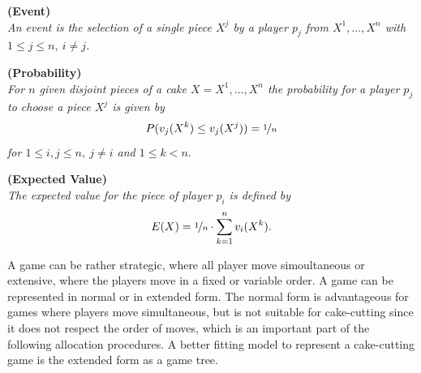\begin{defi}{\textbf{(Event)}}\\
\emph{An \emph{event} is the selection of a single piece $X^j$ by a player $p_j$ from $X^1, \ldots, X^n$ with $1 \leq j \leq n,\: i \neq j$.}
\end{defi}
\begin{defi}{\textbf{(Probability)}}\\
\emph{For $n$ given disjoint pieces of a cake $X=X^1, \ldots, X^n$ the \emph{probability} for a player $p_j$ to 
choose a piece $X^j$ is given by $${P}(v_j(X^k) \leq v_j(X^j))=\nicefrac{1}{n}$$ for $1 \leq i,j \leq n,\: j\neq i$ and $1 \leq k < n.$} 
\end{defi}
\begin{defi}{\textbf{(Expected Value)}}\\
\emph{The \emph{expected value} for the piece of player $p_i$ is defined by $$E(X)= \nicefrac{1}{n} \cdot \sum\limits_{k=1}^n v_i(X^k).$$} 
\end{defi}
A game can be rather strategic, where all player move simoultaneous or extensive, where the players move in a fixed or variable order. A game can be represented in normal or in extended form. The normal form is advantageous for games where players move simultaneous, but is not suitable for cake-cutting since it does not respect the order of moves, which is an important part of the following allocation procedures. A better fitting model to represent a cake-cutting game is the extended form as a game tree.
\newpage
{}
